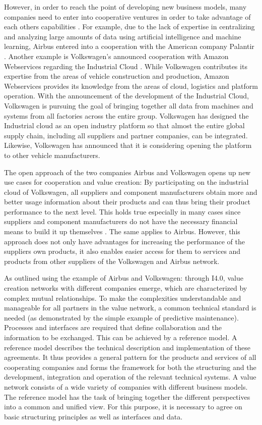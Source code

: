 However, in order to reach the point of developing new business models, many companies need to enter into cooperative ventures in order to take advantage of each others capabilities \cite{Russo2018HowCompetition}. For example, due to the lack of expertise in centralizing and analyzing large amounts of data using artificial intelligence and machine learning, Airbus entered into a cooperation with the American company Palantir \cite{Hanke2019AirbusWerden}. Another example is Volkswagen's announced cooperation with Amazon Webservices regarding the Industrial Cloud \cite{VolkswagenAG2019WirLive}. While Volkswagen contributes its expertise from the areas of vehicle construction and production, Amazon Webservices provides its knowledge from the areas of cloud, logistics and platform operation. With the announcement of the development of the Industrial Cloud, Volkswagen is pursuing the goal of bringing together all data from machines and systems from all factories across the entire group. Volkswagen has designed the Industrial cloud as an open industry platform so that almost the entire global supply chain, including all suppliers and partner companies, can be integrated. Likewise, Volkswagen has announced that it is considering opening the platform to other vehicle manufacturers.

The open approach of the two companies Airbus and Volkswagen opens up new use cases for cooperation and value creation: By participating on the industrial cloud of Volkswagen, all suppliers and component manufacturers obtain more and better usage information about their products and can thus bring their product performance to the next level. This holds true especially in many cases since suppliers and component manufacturers do not have the necessary financial means to build it up themselves \cite{Russo2018HowCompetition}. The same applies to Airbus. However, this approach does not only have advantages for increasing the performance of the suppliers own products, it also enables easier access for them to services and products from other suppliers of the Volkswagen and Airbus network. 

As outlined using the example of Airbus and Volkswagen: through \ac{I4.0}, value creation networks with different companies emerge, which are characterized by complex mutual relationships. To make the complexities understandable and manageable for all partners in the value network, a common technical standard is needed (as demonstrated by the simple example of predictive maintenance). Processes and interfaces are required that define collaboration and the information to be exchanged. This can be achieved by a reference model. A reference model describes the technical description and implementation of these agreements. It thus provides a general pattern for the products and services of all cooperating companies and forms the framework for both the structuring and the development, integration and operation of the relevant technical systems. A value network consists of a wide variety of companies with different business models. The reference model has the task of bringing together the different perspectives into a common and unified view. For this purpose, it is necessary to agree on basic structuring principles as well as interfaces and data.

